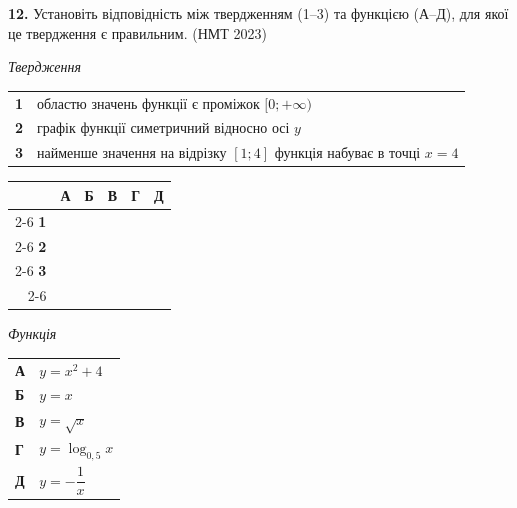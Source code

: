 \documentclass[14pt]{extarticle}
\newcommand{\nmtyear}[1]{\hfill{\small\color{yearcolor}(НМТ #1)}}
\begin{document}
\vspace{0.7cm}

\noindent\textbf{12.} Установіть відповідність між твердженням (1--3) та функцією (А--Д), для якої це твердження є правильним. \nmtyear{2023}

\vspace{0.3cm}

\noindent
\begin{minipage}[t]{0.50\textwidth}
    \textit{Твердження} \par \vspace{0.2cm}
    \begin{tabular}{@{}p{0.5cm} p{6.5cm}@{}}
    \textbf{1} & областю значень функції є проміжок $[0; +\infty)$ \\
    \textbf{2} & графік функції симетричний відносно осі $y$ \\
    \textbf{3} & найменше значення на відрізку $[1; 4]$ функція набуває в точці $x = 4$ \\
    \end{tabular}
    
    \vspace{0.3cm}
    
    \begingroup
    \setlength{\tabcolsep}{4pt}
    \renewcommand{\arraystretch}{1.2}
    \small
    \begin{tabular}{r|c|c|c|c|c|}
         \multicolumn{1}{c}{} & \multicolumn{1}{c}{\textbf{А}} & \multicolumn{1}{c}{\textbf{Б}} & \multicolumn{1}{c}{\textbf{В}} & \multicolumn{1}{c}{\textbf{Г}} & \multicolumn{1}{c}{\textbf{Д}} \\ \cline{2-6}
         \textbf{1} & & & & & \\ \cline{2-6}
         \textbf{2} & & & & & \\ \cline{2-6}
         \textbf{3} & & & & & \\ \cline{2-6}
    \end{tabular}
    \endgroup
\end{minipage}%
\hfill
\begin{minipage}[t]{0.45\textwidth}
    \textit{Функція} \par \vspace{0.2cm}
    \begin{tabular}{ll}
    \textbf{А} & $y = x^2 + 4$ \\[0.2cm]
    \textbf{Б} & $y = x$ \\[0.2cm]
    \textbf{В} & $y = \sqrt{x}$ \\[0.2cm]
    \textbf{Г} & $y = \log_{0{,}5} x$ \\[0.2cm]
    \textbf{Д} & $y = -\dfrac{1}{x}$ \\
    \end{tabular}
\end{minipage}
\end{document}
